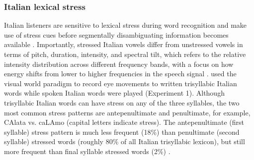 \subsubsection{Italian lexical stress}
Italian listeners are sensitive to lexical stress during word recognition and make use of stress cues before segmentally disambiguating information becomes available \citep{Tagliapietra2005, Sulpizio_McQueen_2012}. Importantly, stressed Italian vowels differ from unstressed vowels in terms of pitch, duration, intensity, and spectral tilt, which refers to the relative intensity distribution across different frequency bands, with a focus on how energy shifts from lower to higher frequencies in the speech signal \citep{Maturi1998}. \cite{Sulpizio_McQueen_2012} used the visual world paradigm to record eye movements to written trisyllabic Italian words while spoken Italian words were played (Experiment 1). Although trisyllabic Italian words can have stress on any of the three syllables, the two most common stress patterns are antepenultimate and penultimate, for example, CAlata vs. caLAmo (capital letters indicate stress). The antepenultimate (first syllable) stress pattern is much less frequent (18\%) than penultimate (second syllable) stressed words (roughly 80\% of all Italian trisyllabic lexicon), but still more frequent than final syllable stressed words (2\%) \citep{thornton_1997}. 

